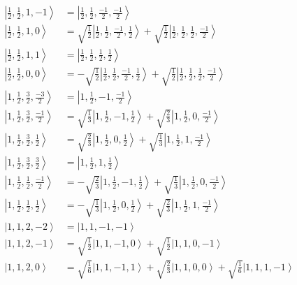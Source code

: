\documentclass{report}
\newcommand{\ket}[1]{\left| #1 \right>} %
\begin{document}
\small

\begin{align*}
\ket{ \frac{1}{2} ,  \frac{1}{2} ,  1 ,  -1  } &=  \ket{ \frac{1}{2} ,  \frac{1}{2} ,  \frac{-1}{2} ,  \frac{-1}{2}  } \\
\ket{ \frac{1}{2} ,  \frac{1}{2} ,  1 ,  0  } &=  \sqrt{  \frac{1}{2}  } \ket{ \frac{1}{2} ,  \frac{1}{2} ,  \frac{-1}{2} ,  \frac{1}{2}  } + \sqrt{  \frac{1}{2}  } \ket{ \frac{1}{2} ,  \frac{1}{2} ,  \frac{1}{2} ,  \frac{-1}{2}  } \\
\ket{ \frac{1}{2} ,  \frac{1}{2} ,  1 ,  1  } &=  \ket{ \frac{1}{2} ,  \frac{1}{2} ,  \frac{1}{2} ,  \frac{1}{2}  } \\
\ket{ \frac{1}{2} ,  \frac{1}{2} ,  0 ,  0  } &=  - \sqrt{  \frac{1}{2}  } \ket{ \frac{1}{2} ,  \frac{1}{2} ,  \frac{-1}{2} ,  \frac{1}{2}  } + \sqrt{  \frac{1}{2}  } \ket{ \frac{1}{2} ,  \frac{1}{2} ,  \frac{1}{2} ,  \frac{-1}{2}  } \\
\ket{ 1 ,  \frac{1}{2} ,  \frac{3}{2} ,  \frac{-3}{2}  } &=  \ket{ 1 ,  \frac{1}{2} ,  -1 ,  \frac{-1}{2}  } \\
\ket{ 1 ,  \frac{1}{2} ,  \frac{3}{2} ,  \frac{-1}{2}  } &=  \sqrt{  \frac{1}{3}  } \ket{ 1 ,  \frac{1}{2} ,  -1 ,  \frac{1}{2}  } + \sqrt{  \frac{2}{3}  } \ket{ 1 ,  \frac{1}{2} ,  0 ,  \frac{-1}{2}  } \\
\ket{ 1 ,  \frac{1}{2} ,  \frac{3}{2} ,  \frac{1}{2}  } &=  \sqrt{  \frac{2}{3}  } \ket{ 1 ,  \frac{1}{2} ,  0 ,  \frac{1}{2}  } + \sqrt{  \frac{1}{3}  } \ket{ 1 ,  \frac{1}{2} ,  1 ,  \frac{-1}{2}  } \\
\ket{ 1 ,  \frac{1}{2} ,  \frac{3}{2} ,  \frac{3}{2}  } &=  \ket{ 1 ,  \frac{1}{2} ,  1 ,  \frac{1}{2}  } \\
\ket{ 1 ,  \frac{1}{2} ,  \frac{1}{2} ,  \frac{-1}{2}  } &=  - \sqrt{  \frac{2}{3}  } \ket{ 1 ,  \frac{1}{2} ,  -1 ,  \frac{1}{2}  } + \sqrt{  \frac{1}{3}  } \ket{ 1 ,  \frac{1}{2} ,  0 ,  \frac{-1}{2}  } \\
\ket{ 1 ,  \frac{1}{2} ,  \frac{1}{2} ,  \frac{1}{2}  } &=  - \sqrt{  \frac{1}{3}  } \ket{ 1 ,  \frac{1}{2} ,  0 ,  \frac{1}{2}  } + \sqrt{  \frac{2}{3}  } \ket{ 1 ,  \frac{1}{2} ,  1 ,  \frac{-1}{2}  } \\
\ket{ 1 ,  1 ,  2 ,  -2  } &=  \ket{ 1 ,  1 ,  -1 ,  -1  } \\
\ket{ 1 ,  1 ,  2 ,  -1  } &=  \sqrt{  \frac{1}{2}  } \ket{ 1 ,  1 ,  -1 ,  0  } + \sqrt{  \frac{1}{2}  } \ket{ 1 ,  1 ,  0 ,  -1  } \\
\ket{ 1 ,  1 ,  2 ,  0  } &=  \sqrt{  \frac{1}{6}  } \ket{ 1 ,  1 ,  -1 ,  1  } + \sqrt{  \frac{2}{3}  } \ket{ 1 ,  1 ,  0 ,  0  } + \sqrt{  \frac{1}{6}  } \ket{ 1 ,  1 ,  1 ,  -1  } \\

\end{align*}
\end{document}
